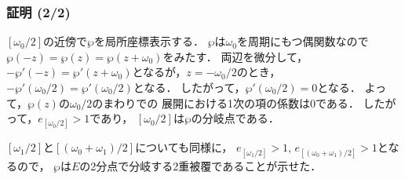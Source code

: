 \documentclass[dvipdfmx,12pt,aspectratio=169]{beamer}%
\def\fracinline#1/#2{\mbox{\raise0.5ex\hbox{\footnotesize$#1$}{\hskip-.1em$/$\hskip-.1em}\raise-0.5ex\hbox{\footnotesize$#2$}}}
\begin{document}
\begin{frame}
    \frametitle{証明 (2/2)}
    \setlength{\baselineskip}{18pt}
    $[\omega_0/2]$の近傍で$\wp$を局所座標表示する．
    $\wp$は$\omega_0$を周期にもつ偶関数なので
    $\wp(-z)=\wp(z)=\wp(z+\omega_0)$をみたす．
    両辺を微分して，
    $-\wp'(-z)=\wp'(z+\omega_0)$となるが，$z=-\omega_0/2$のとき，
    $-\wp'(\omega_0/2)=\wp'(\omega_0/2)$となる．
    したがって，$\wp'(\omega_0/2)=0$となる．
    よって，$\wp(z)$の$\omega_0/2$のまわりでの
    展開における1次の項の係数は0である．
    したがって，$e_{[\omega_0/2]}>1$であり，
    $[\omega_0/2]$は$\wp$の分岐点である．

    $[\omega_1/2]$と$[(\omega_0+\omega_1)/2]$についても同様に，
    $e_{[\omega_1/2]}>1$, $e_{[(\omega_0+\omega_1)/2]}>1$となるので，
    $\wp$は$E$の2分点で分岐する2重被覆であることが示せた．

\end{frame}
    

\end{document}

